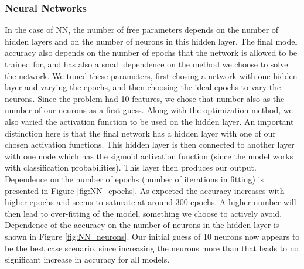 

\subsubsection{Neural Networks}

In the case of NN, the number of free parameters depends on the number of hidden layers and on the number of neurons in this hidden layer. The final model accuracy also depends on the number of epochs that the network is allowed to be trained for, and has also a small dependence on the method we choose to solve the network. We tuned these parameters, first chosing a network with one hidden layer and varying the epochs, and then choosing the ideal epochs to vary the neurons. Since the problem had 10 features, we chose that number also as the number of our neurons as a first guess. Along with the optimization method, we also varied the activation function to be used on the hidden layer. An important distinction here is that the final network has a hidden layer with one of our chosen activation functions. This hidden layer is then connected to another layer with one node which has the sigmoid activation function (since the model works with classification probabilities). This layer then produces our output. \\
Dependence on the number of epochs (number of iterations in fitting) is presented in Figure \ref{fig:NN_epochs}. As expected the accuracy increases with higher epochs and seems to saturate at around 300 epochs. A higher number will then lead to over-fitting of the model, something we choose to actively avoid.
Dependence of the accuracy on the number of neurons in the hidden layer is shown in Figure \ref{fig:NN_neurons}. Our initial guess of 10 neurons now appears to be the best case scenario, since increasing the neurons more than that leads to no significant increase in accuracy for all models. 

